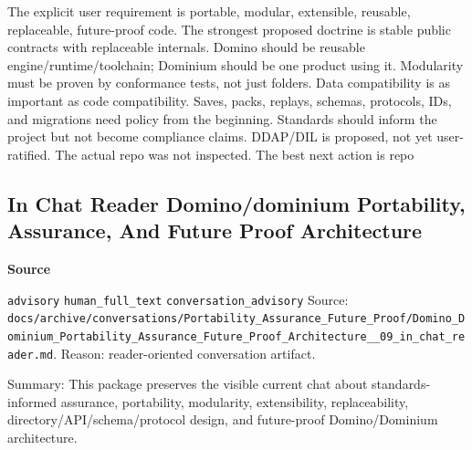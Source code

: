 \documentclass[9pt,a4paper,openany]{book}
\newcommand{\vonecallout}[3]{\par\medskip\noindent\begingroup\setlength{\fboxsep}{7pt}\colorbox{DomCalloutBg}{\parbox{0.94\linewidth}{\textbf{\textcolor{#1}{#2}}\par #3}}\endgroup\par\medskip}
\begin{document}
The explicit user requirement is portable, modular, extensible, reusable, replaceable, future-\allowbreak{}proof code.\allowbreak{} The strongest proposed doctrine is stable public contracts with replaceable internals.\allowbreak{} Domino should be reusable engine/\allowbreak{}runtime/\allowbreak{}toolchain; Dominium should be one product using it.\allowbreak{} Modularity must be proven by conformance tests, not just folders.\allowbreak{} Data compatibility is as important as code compatibility.\allowbreak{} Saves, packs, replays, schemas, protocols, IDs, and migrations need policy from the beginning.\allowbreak{} Standards should inform the project but not become compliance claims.\allowbreak{} DDAP/\allowbreak{}DIL is proposed, not yet user-\allowbreak{}ratified.\allowbreak{} The actual repo was not inspected.\allowbreak{} The best next action is repo



\subsection{In Chat Reader Domino/dominium Portability, Assurance, And Future Proof Architecture}

\vonecallout{DomSlate}{Source}{\texttt{advisory} \texttt{human\_\allowbreak{}full\_\allowbreak{}text} \texttt{conversation\_\allowbreak{}advisory} Source: \texttt{docs/\allowbreak{}archive/\allowbreak{}conversations/\allowbreak{}Portability\_\allowbreak{}Assurance\_\allowbreak{}Future\_\allowbreak{}Proof/\allowbreak{}Domino\_\allowbreak{}Dominium\_\allowbreak{}Portability\_\allowbreak{}Assurance\_\allowbreak{}Future\_\allowbreak{}Proof\_\allowbreak{}Architecture\_\allowbreak{}\_\allowbreak{}09\_\allowbreak{}in\_\allowbreak{}chat\_\allowbreak{}reader.\allowbreak{}md}.\allowbreak{} Reason: reader-\allowbreak{}oriented conversation artifact.\allowbreak{}}

Summary: This package preserves the visible current chat about standards-\allowbreak{}informed assurance, portability, modularity, extensibility, replaceability, directory/\allowbreak{}API/\allowbreak{}schema/\allowbreak{}protocol design, and future-\allowbreak{}proof Domino/\allowbreak{}Dominium architecture.\allowbreak{}
\end{document}
